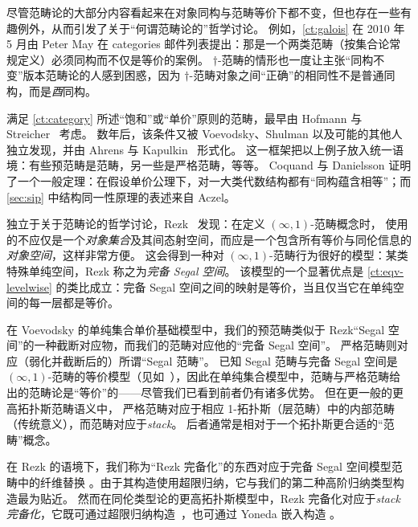 尽管范畴论的大部分内容看起来在对象同构与范畴等价下都不变，但也存在一些有趣例外，从而引发了关于“何谓范畴论的”哲学讨论。
例如，\cref{ct:galois} 在 2010 年 5 月由 Peter May 在 categories 邮件列表提出：那是一个两类范畴（按集合论常规定义）必须同构而不仅是等价的案例。
$\dagger$-范畴的情形也一度让主张“同构不变”版本范畴论的人感到困惑，因为 $\dagger$-范畴对象之间“正确”的相同性不是普通同构，而是\emph{酉}同构。
%

满足 \cref{ct:category} 所述“饱和”或“单价”原则的范畴，最早由 Hofmann 与 Streicher~\cite{hs:gpd-typethy} 考虑。
数年后，该条件又被 Voevodsky、Shulman 以及可能的其他人独立发现，并由 Ahrens 与 Kapulkin~\cite{aks:rezk} 形式化。
这一框架把以上例子放入统一语境：有些预范畴是范畴，另一些是严格范畴，等等。
Coquand 与 Danielsson 证明了一个一般定理：在假设单价公理下，对一大类代数结构都有“同构蕴含相等”；而 \cref{sec:sip} 中结构同一性原理的表述来自 Aczel。

独立于关于范畴论的哲学讨论，Rezk~\cite{rezk01css} 发现：在定义 $(\infty,1)$-范畴概念时，
%
使用的不应仅是一个\emph{对象集合}及其间态射空间，而应是一个包含所有等价与同伦信息的\emph{对象空间}，这样非常方便。
这会得到一种对 $(\infty,1)$-范畴行为很好的模型：某类特殊单纯空间，Rezk 称之为\emph{完备 Segal 空间}。
%
%
该模型的一个显著优点是 \cref{ct:eqv-levelwise} 的类比成立：完备 Segal 空间之间的映射是等价，当且仅当它在单纯空间的每一层都是等价。

在 Voevodsky 的单纯集合单价基础模型中，我们的预范畴类似于 Rezk“Segal 空间”的一种截断对应物，而我们的范畴对应他的“完备 Segal 空间”。
%
严格范畴则对应（弱化并截断后的）所谓“Segal 范畴”。
已知 Segal 范畴与完备 Segal 空间是 $(\infty,1)$-范畴的等价模型（见如~\cite{bergner:infty-one}），因此在单纯集合模型中，范畴与严格范畴给出的范畴论是“等价”的——尽管我们已看到前者仍有诸多优势。
但在更一般的更高拓扑斯范畴语义中，
%
严格范畴对应于相应 1-拓扑斯（层范畴）中的内部范畴（传统意义），而范畴对应于\emph{stack}。
%
后者通常是相对于一个拓扑斯更合适的“范畴”概念。

在 Rezk 的语境下，我们称为“Rezk 完备化”的东西对应于完备 Segal 空间模型范畴中的纤维替换
。由于其构造使用超限归纳，它与我们的第二种高阶归纳类型构造最为贴近。
然而在同伦类型论的更高拓扑斯模型中，Rezk 完备化对应于\emph{stack 完备化}，它既可通过超限归纳构造~\cite{jt:strong-stacks}，也可通过 Yoneda 嵌入构造 \cite{bunge:stacks-morita-internal}。


